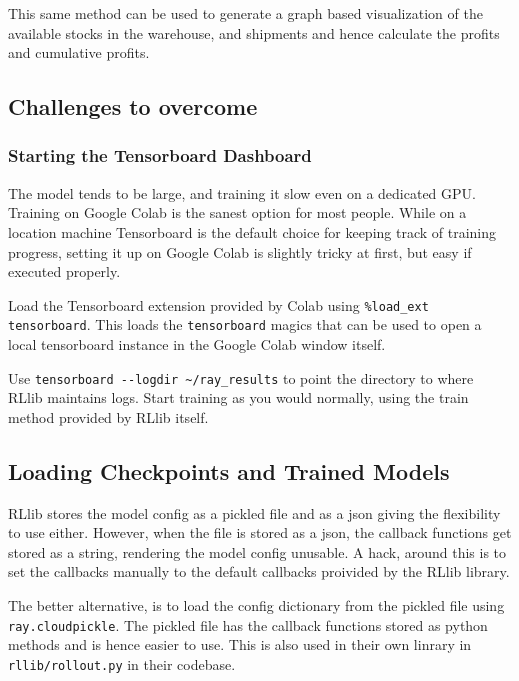 \documentclass{article}
\begin{document}
This same method can be used to generate a graph based visualization of the available stocks in the warehouse, and shipments and hence calculate the profits and cumulative profits. 

\subsection{Challenges to overcome}
\subsubsection{Starting the Tensorboard Dashboard}
The model tends to be large, and training it slow even on a dedicated GPU. Training on Google Colab is the sanest option for most people. While on a location machine Tensorboard is the default choice for keeping track of training progress, setting it up on Google Colab is slightly tricky at first, but easy if executed properly.


Load the Tensorboard extension provided by Colab using \lstinline{%load_ext tensorboard}. This loads the \lstinline{tensorboard} magics that can be used to open a local tensorboard instance in the Google Colab window itself.

Use \lstinline{tensorboard --logdir ~/ray_results} to point the directory to where RLlib maintains logs. Start training as you would normally, using the train method provided by RLlib itself. 

\subsection{Loading Checkpoints and Trained Models}
RLlib stores the model config as a pickled file and as a json giving the flexibility to use either. However, when the file is stored as a json, the callback functions get stored as a string, rendering the model config unusable. A hack, around this is to set the callbacks manually to the default callbacks proivided by the RLlib library.

The better alternative, is to load the config dictionary from the pickled file using \lstinline{ray.cloudpickle}. The pickled file has the callback functions stored as python methods and is hence easier to use. This is also used in their own linrary in \lstinline{rllib/rollout.py} in their codebase. 

% 
% 
\end{document}
